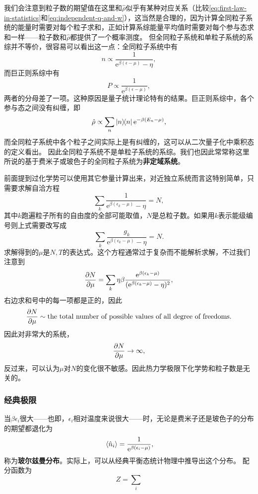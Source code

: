 \documentclass[hyperref, UTF8, a4paper]{ctexart}
\newcommand*{\ee}{\mathrm{e}}
\begin{document}
我们会注意到粒子数的期望值在这里和$\hat{\rho}$似乎有某种对应关系（比较\eqref{eq:first-law-in-statistics}和\eqref{eq:independent-q-and-w}），这当然是合理的，因为计算全同粒子系统的能量时需要对每个粒子求和，正如计算系综能量平均值时需要对每个参与态求和一样——粒子数和$\hat{\rho}$都提供了一个概率测度。
但全同粒子系统和单粒子系统的系综并不等价，很容易可以看出这一点：全同粒子系统中有
\[
    n \propto \frac{1}{\ee^{\beta (\epsilon - \mu)} - \eta},
\]
而巨正则系综中有
\[
    P \propto \frac{1}{\ee^{\beta (\epsilon - \mu)}},
\]
两者的分母差了一项。这种原因是量子统计理论特有的结果。巨正则系综中，各个参与态之间没有纠缠，即
\[
    \hat{\rho} \propto \sum_n \dyad{n} \ee^{- \beta (E_n - \mu)},
\]
而全同粒子系统中各个粒子之间实际上是有纠缠的，这可以从二次量子化中乘积态的定义看出。
因此全同粒子系统不是单粒子系统的系综。我们也因此常常称这里所说的基于费米子或玻色子的全同粒子系统为\textbf{非定域系统}。

前面提到过化学势可以使用其它参量计算出来，对近独立系统而言这特别简单，只需要求解自洽方程
\begin{equation}
    \sum_k \frac{1}{\ee^{\beta (\epsilon_k - \mu)} - \eta} = N,
\end{equation}
其中$k$跑遍粒子所有的自由度的全部可能取值，$N$是总粒子数。如果用$k$表示能级编号则上式需要改写成
\[
    \sum_k \frac{g_k}{\ee^{\beta (\epsilon_k - \mu)} - \eta} = N.
\]
求解得到的$\mu$是$N,T$的表达式。这个方程通常过于复杂而不能解析求解，不过我们注意到
\[
    \pdv{N}{\mu} = \sum_k \eta \beta \frac{\ee^{\beta (\epsilon_k - \mu)}}{(\ee^{ \beta (\epsilon_k - \mu)} - \eta)^2},
\]
右边求和号中的每一项都是正的，因此
\[
    \pdv{N}{\mu} \sim \text{the total number of possible values of all degree of freedoms}.
\]
因此对非常大的系统，
\[
    \pdv{N}{\mu} \to \infty,
\]
反过来，可以认为$\mu$对$N$的变化很不敏感。因此热力学极限下化学势和粒子数是无关的。

\subsubsection{经典极限}

当$\beta \epsilon_i$很大——也即，$\epsilon_i$相对温度来说很大——时，无论是费米子还是玻色子的分布的期望都退化为
\begin{equation}
    \expval*{\hat{n}_i} = \frac{1}{\ee^{\beta (\epsilon_i - \mu)}},
    \label{eq:boltzman-distribution}
\end{equation}
称为\textbf{玻尔兹曼分布}。实际上，可以从经典平衡态统计物理中推导出这个分布。
配分函数为
\[
    Z = \sum_i 
\]
\end{document}

